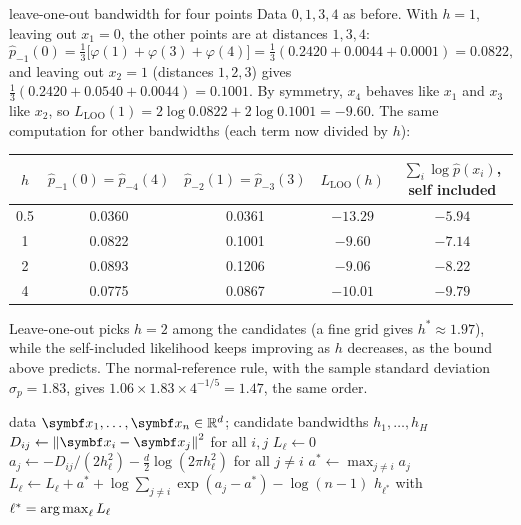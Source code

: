 \documentclass[11pt]{article}
\begin{document}
\begin{worked}{leave-one-out bandwidth for four points}
Data $0, 1, 3, 4$ as before. With $h = 1$, leaving out $x_1 = 0$, the other points are at distances $1, 3, 4$:
\[
  \hat p_{-1}(0) = \tfrac{1}{3}\big[\varphi(1) + \varphi(3) + \varphi(4)\big] = \tfrac{1}{3}(0.2420 + 0.0044 + 0.0001)
  = 0.0822 ,
\]
and leaving out $x_2 = 1$ (distances $1, 2, 3$) gives $\tfrac{1}{3}(0.2420 + 0.0540 + 0.0044) = 0.1001$. By symmetry,
$x_4$ behaves like $x_1$ and $x_3$ like $x_2$, so $L_{\mathrm{LOO}}(1) = 2\log 0.0822 + 2\log 0.1001 = -9.60$. The
same computation for other bandwidths (each term now divided by $h$):
\begin{center}\small
\begin{tabular}{@{}ccccc@{}}
\toprule
$h$ & $\hat p_{-1}(0) = \hat p_{-4}(4)$ & $\hat p_{-2}(1) = \hat p_{-3}(3)$ & $L_{\mathrm{LOO}}(h)$ &
$\sum_i \log \hat p(x_i)$, self included \\
\midrule
0.5 & 0.0360 & 0.0361 & $-13.29$ & $-5.94$ \\
1 & 0.0822 & 0.1001 & $-9.60$ & $-7.14$ \\
2 & 0.0893 & 0.1206 & $\mathbf{-9.06}$ & $-8.22$ \\
4 & 0.0775 & 0.0867 & $-10.01$ & $-9.79$ \\
\bottomrule
\end{tabular}
\end{center}
Leave-one-out picks $h = 2$ among the candidates (a fine grid gives $h^* \approx 1.97$), while the self-included
likelihood keeps improving as $h$ decreases, as the bound above predicts. The normal-reference rule, with the sample
standard deviation $\hat\sigma_p = 1.83$, gives $1.06 \times 1.83 \times 4^{-1/5} = 1.47$, the same order.
\end{worked}

\begin{algorithm}[htbp]
\caption{Bandwidth selection by leave-one-out log-likelihood}
\label{alg:loo}
\begin{algorithmic}[1]
\Require data $\x_1, \dots, \x_n \in \R^d$; candidate bandwidths $h_1, \dots, h_H$
\State $D_{ij} \gets \norm{\x_i - \x_j}^2$ for all $i, j$ 
  \State $L_\ell \gets 0$
    \State $a_j \gets -D_{ij}/(2h_\ell^2) - \frac{d}{2}\log(2\pi h_\ell^2)$ for all $j \ne i$ 
    \State $a^* \gets \max_{j \ne i} a_j$
    \State $L_\ell \gets L_\ell + a^* + \log \sum_{j \ne i} \exp(a_j - a^*) - \log(n-1)$ 
  \EndFor
\EndFor
\State \Return $h_{\ell^*}$ with $\ell^* = \operatorname*{arg\,max}_\ell L_\ell$
\end{algorithmic}
\end{algorithm}
\end{document}
